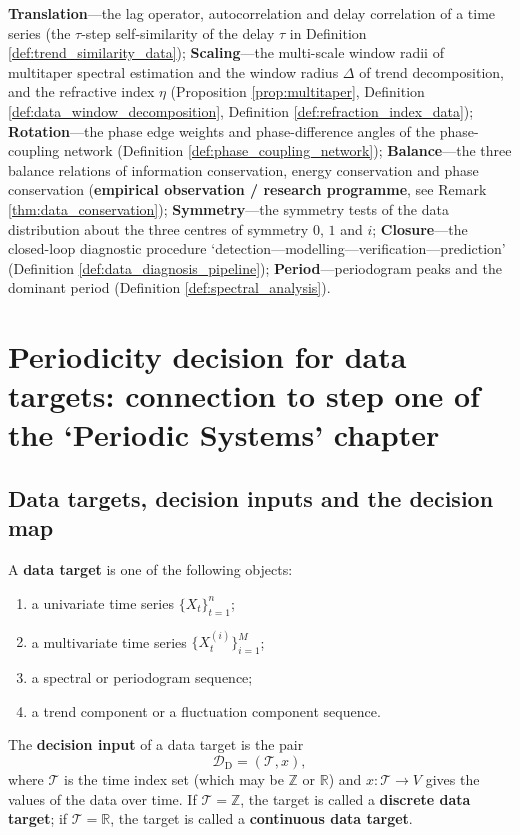 \begin{remark}\label{rem:data_seven_themes}
\textbf{Translation}---the lag operator, autocorrelation and delay correlation of a time series (the $\tau$-step self-similarity of the delay $\tau$ in Definition \ref{def:trend_similarity_data}); \textbf{Scaling}---the multi-scale window radii of multitaper spectral estimation and the window radius $\Delta$ of trend decomposition, and the refractive index $\eta$ (Proposition \ref{prop:multitaper}, Definition \ref{def:data_window_decomposition}, Definition \ref{def:refraction_index_data}); \textbf{Rotation}---the phase edge weights and phase-difference angles of the phase-coupling network (Definition \ref{def:phase_coupling_network}); \textbf{Balance}---the three balance relations of information conservation, energy conservation and phase conservation (\textbf{empirical observation / research programme}, see Remark \ref{thm:data_conservation}); \textbf{Symmetry}---the symmetry tests of the data distribution about the three centres of symmetry $0$, $1$ and $i$; \textbf{Closure}---the closed-loop diagnostic procedure `detection---modelling---verification---prediction' (Definition \ref{def:data_diagnosis_pipeline}); \textbf{Period}---periodogram peaks and the dominant period (Definition \ref{def:spectral_analysis}).
\end{remark}

\section{Periodicity decision for data targets: connection to step one of the `Periodic Systems' chapter}
\label{sec:data_periodicity_decision}

\subsection{Data targets, decision inputs and the decision map}

\begin{definition}\label{def:data_target}
A \textbf{data target} is one of the following objects:
\begin{enumerate}[label=(\roman*)]
    \item a univariate time series $\{X_t\}_{t=1}^{n}$;
    \item a multivariate time series $\{X_t^{(i)}\}_{i=1}^{M}$;
    \item a spectral or periodogram sequence;
    \item a trend component or a fluctuation component sequence.
\end{enumerate}
The \textbf{decision input} of a data target is the pair
\[
\mathcal D_{\mathrm{D}}=(\mathcal T,x),
\]
where $\mathcal T$ is the time index set (which may be $\mathbb Z$ or $\mathbb R$) and $x:\mathcal T\to V$ gives the values of the data over time. If $\mathcal T=\mathbb Z$, the target is called a \textbf{discrete data target}; if $\mathcal T=\mathbb R$, the target is called a \textbf{continuous data target}.
\end{definition}

